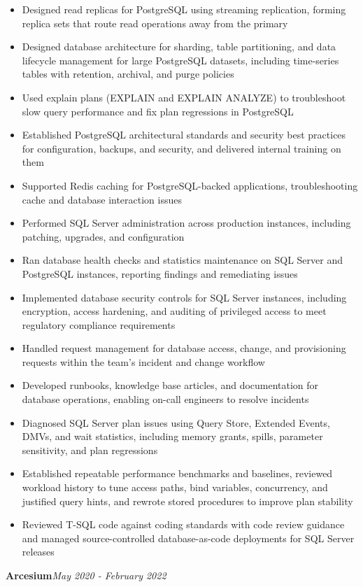 \documentclass[10pt,a4paper]{article}
\begin{document}
\begin{itemize}
  \item Designed read replicas for PostgreSQL using streaming replication, forming replica sets that route read operations away from the primary
  \item Designed database architecture for sharding, table partitioning, and data lifecycle management for large PostgreSQL datasets, including time-series tables with retention, archival, and purge policies
  \item Used explain plans (EXPLAIN and EXPLAIN ANALYZE) to troubleshoot slow query performance and fix plan regressions in PostgreSQL
  \item Established PostgreSQL architectural standards and security best practices for configuration, backups, and security, and delivered internal training on them
  \item Supported Redis caching for PostgreSQL-backed applications, troubleshooting cache and database interaction issues
  \item Performed SQL Server administration across production instances, including patching, upgrades, and configuration
  \item Ran database health checks and statistics maintenance on SQL Server and PostgreSQL instances, reporting findings and remediating issues
  \item Implemented database security controls for SQL Server instances, including encryption, access hardening, and auditing of privileged access to meet regulatory compliance requirements
  \item Handled request management for database access, change, and provisioning requests within the team's incident and change workflow
  \item Developed runbooks, knowledge base articles, and documentation for database operations, enabling on-call engineers to resolve incidents
  \item Diagnosed SQL Server plan issues using Query Store, Extended Events, DMVs, and wait statistics, including memory grants, spills, parameter sensitivity, and plan regressions
  \item Established repeatable performance benchmarks and baselines, reviewed workload history to tune access paths, bind variables, concurrency, and justified query hints, and rewrote stored procedures to improve plan stability
  \item Reviewed T-SQL code against coding standards with code review guidance and managed source-controlled database-as-code deployments for SQL Server releases
\end{itemize}
\vspace{14.7pt}
\noindent\textbf{Arcesium}\hfill \textit{May 2020 - February 2022}
\end{document}
